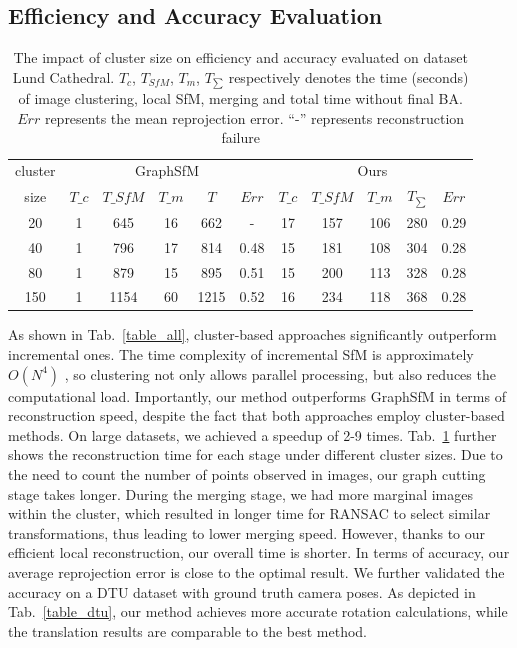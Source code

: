 \documentclass[runningheads]{llncs}
\begin{document}
\subsection{Efficiency and Accuracy Evaluation}
\begin{table}[th]
\setlength{\abovecaptionskip}{1cm} 
\caption{The impact of cluster size on efficiency and accuracy evaluated on dataset Lund Cathedral. $T_{c}$, $T_{SfM}$, $T_{m}$, $T_{\sum}$ respectively denotes the time (seconds) of image clustering, local SfM, merging and total time without final BA. $Err$ represents the mean reprojection error. “-” represents reconstruction failure}
{
\begin{tabular}{|c|c|c|c|c|c|c|c|c|c|c|}
\hline

\multicolumn{1}{|c|}{cluster} 
	& 	\multicolumn{5}{c|}{GraphSfM}
	&	\multicolumn{5}{c|}{Ours}
	\\	
 
\cline{2-11}
\multicolumn{1}{|c|}{size}  &$T\_c$ & $T\_{SfM}$ &$T\_m$ &$T$ & $Err$   &$T\_c$ & $T\_{SfM}$ &$T\_m$  &$T_{\sum}$ & $Err$\\
\hline  

20 & 1 & 645 &16  &662 & -       &17 & 157 &106  &280 & 0.29\\
40 & 1 & 796 &17  &814 & 0.48    &15 & 181 &108  &304 & 0.28\\
80 & 1 & 879 &15  &895 & 0.51    &15 & 200 &113  &328 & 0.28\\
150 & 1 & 1154 &60  &1215 & 0.52  &16 & 234 &118  &368 & 0.28\\

\hline
\end{tabular}
}
\centering
\vspace{-0.5em}
\label{table_size}
\end{table}

As shown in Tab.~\ref{table_all}, cluster-based approaches significantly outperform incremental ones. The time complexity of incremental SfM is approximately $O(N^4)$ \cite{ON4}, so clustering not only allows parallel processing, but also reduces the computational load. Importantly, our method outperforms GraphSfM in terms of reconstruction speed, despite the fact that both approaches employ cluster-based methods. On large datasets, we achieved a speedup of 2-9 times. Tab.~\ref{table_size} further shows the reconstruction time for each stage under different cluster sizes. Due to the need to count the number of points observed in images, our graph cutting stage takes longer. During the merging stage, we had more marginal images within the cluster, which resulted in longer time for RANSAC to select similar transformations, thus leading to lower merging speed. However, thanks to our efficient local reconstruction, our overall time is shorter. In terms of accuracy, our average reprojection error is close to the optimal result. We further validated the accuracy on a DTU dataset with ground truth camera poses. As depicted in Tab.~\ref{table_dtu}, our method achieves more accurate rotation calculations, while the translation results are comparable to the best method.
\end{document}
